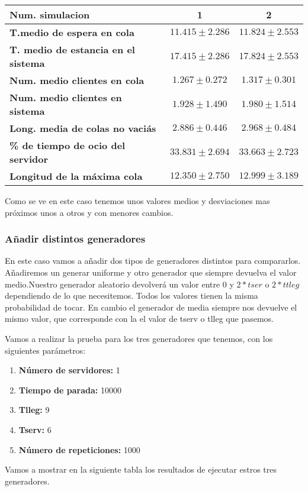 \documentclass[]{article}
\begin{document}
\begin{table}[H]
	\begin{center}
		\begin{tabularx}{1\textwidth}{|X|c|c|}
			\hline
			\textbf{Num. simulacion} &  1 & 2\\
			\hline \hline
			\textbf{T.medio de espera en cola}& $11.415\pm2.286$ & $11.824\pm2.553$ \\ \hline
			\textbf{T. medio de estancia en el sistema} & $17.415\pm2.286$ & $17.824\pm2.553$ \\ \hline
			\textbf{Num. medio clientes en cola} & $1.267\pm0.272$& $1.317\pm0.301$ \\  \hline
			\textbf{Num. medio clientes en sistema} & $1.928\pm1.490$& $1.980\pm1.514$ \\ \hline
			\textbf{Long. media de colas no vaciás} & $2.886\pm0.446$& $2.968\pm0.484$ \\ \hline
			\textbf{\% de tiempo de ocio del servidor} & $33.831\pm2.694$ & $33.663\pm2.723$ \\ \hline
			\textbf{Longitud de la máxima cola} &$12.350\pm2.750$& $12.999\pm3.189$ \\ \hline
		\end{tabularx}
		
	\end{center}
\end{table}
Como se ve en este caso tenemos unos valores medios y desviaciones mas próximos unos a otros y con menores cambios.
\newpage
\subsubsection{Añadir distintos generadores}
En este caso vamos a añadir dos tipos de generadores distintos para compararlos. Añadiremos un generar uniforme y otro generador que siempre devuelva el valor medio.Nuestro generador aleatorio devolverá un valor entre 0 y $2*tser$ o $2*ttleg$ dependiendo de lo que necesitemos. Todos los valores tienen la misma probabilidad de tocar. En cambio el generador de media siempre nos devuelve el mismo valor, que corresponde con la el valor de tserv o tlleg que pasemos. 
\newline

Vamos a realizar la prueba para los tres generadores que tenemos, con los siguientes parámetros:
\begin{enumerate}
	\item \textbf{Número de servidores:} 1
	\item \textbf{Tiempo de parada:} 10000
	\item \textbf{Tlleg:} 9
	\item \textbf{Tserv:} 6
	\item \textbf{Número de repeticiones:} 1000
\end{enumerate} 
Vamos a mostrar en la siguiente tabla los resultados de ejecutar estros tres generadores.
\end{document}
